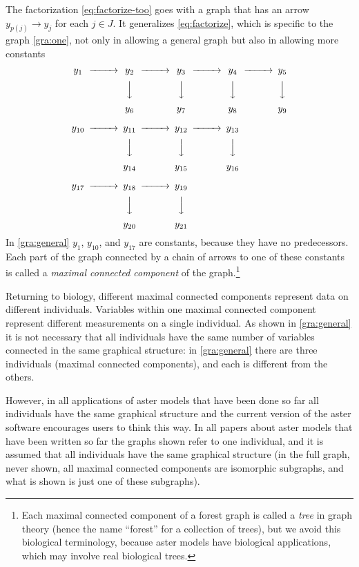 \documentclass[11pt]{article}
\begin{document}
The factorization \eqref{eq:factorize-too} goes with a graph that has an
arrow $y_{p(j)} \to y_j$ for each $j \in J$.  It
generalizes \eqref{eq:factorize}, which is specific
to the graph \eqref{gra:one}, not only in allowing a general graph but also
in allowing more constants
\begin{equation} \label{gra:general}
\begin{CD}
   y_1
   @>>>
   y_2
   @>>>
   y_3
   @>>>
   y_4
   @>>>
   y_5
   \\
   @.
   @VVV
   @VVV
   @VVV
   @VVV
   \\
   \hphantom{y_1}
   @.
   y_6
   @.
   y_7
   @.
   y_8
   @.
   y_9
\\
   y_{10}
   @>>>
   y_{11}
   @>>>
   y_{12}
   @>>>
   y_{13}
   \\
   @.
   @VVV
   @VVV
   @VVV
   \\
   \hphantom{y_{10}}
   @.
   y_{14}
   @.
   y_{15}
   @.
   y_{16}
\\
   y_{17}
   @>>>
   y_{18}
   @>>>
   y_{19}
   \\
   @.
   @VVV
   @VVV
   \\
   \hphantom{y_{17}}
   @.
   y_{20}
   @.
   y_{21}
\end{CD}
\end{equation}
In \eqref{gra:general} $y_1$, $y_{10}$, and $y_{17}$ are constants,
because they have no predecessors.
Each part of the graph connected by a chain of arrows to one
of these constants is called a \emph{maximal connected component}
of the graph.\footnote{Each maximal connected component of a forest graph
is called a \emph{tree} in graph theory (hence the name ``forest'' for a
collection of trees), but we avoid this biological
terminology, because aster models have biological applications, which
may involve real biological trees.}

Returning to biology, different maximal connected
components represent data on different individuals.  Variables within one
maximal connected component represent different measurements on a single
individual.  As shown in \eqref{gra:general} it is not necessary that all
individuals have the same number of variables connected in the same graphical
structure: in \eqref{gra:general} there are three individuals (maximal
connected components), and each is different from the others.

However, in all applications of aster models that have been done so far
all individuals have the same graphical structure and the current version
of the aster software \citep{package}
encourages users to think this way.  In all papers
about aster models that have been written so far the graphs shown refer
to one individual, and it is assumed that all individuals have the
same graphical structure (in the full graph, never shown, all maximal
connected components are isomorphic subgraphs, and what is shown is
just one of these subgraphs).
\end{document}
